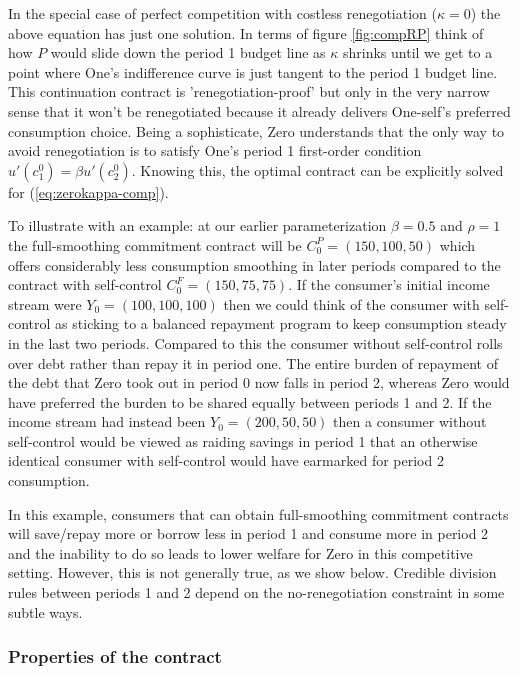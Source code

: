 \documentclass[11pt,english]{article}
\theoremstyle{plain}
\theoremstyle{definition}
\begin{document}
In the special case of perfect competition with costless renegotiation
($\kappa=0$) the above equation has just one solution. In terms of
figure \ref{fig:compRP} think of how $P$ would slide down the period
1 budget line as $\kappa$ shrinks until we get to a point where One's
indifference curve is just tangent to the period 1 budget line. This
continuation contract is 'renegotiation-proof' but only in the very
narrow sense that it won't be renegotiated because it already delivers
One-self's preferred consumption choice. Being a sophisticate, Zero
understands that the only way to avoid renegotiation is to satisfy
One's period 1 first-order condition $u'(c_{1}^{0})=\beta u'(c_{2}^{0})$.
Knowing this, the optimal contract can be explicitly solved for (\ref{eq:zerokappa-comp}).

To illustrate with an example: at our earlier parameterization
$\beta=0.5$ and $\rho=1$ the full-smoothing commitment contract
will be $C_{0}^{P}=(150,100,50)$ which offers considerably less consumption
smoothing in later periods compared to the contract with self-control
$C_{0}^{F}=(150,75,75)$. If the consumer's initial income stream
were $Y_{0}=(100,100,100)$ then we could think of the consumer with
self-control as sticking to a balanced repayment program to keep consumption
steady in the last two periods. Compared to this the consumer without
self-control rolls over debt rather than repay it in period one. The
entire burden of repayment of the debt that Zero took out in period
0 now falls in period 2, whereas Zero would have preferred the burden
to be shared equally between periods 1 and 2. If the income stream
had instead been $Y_{0}=(200,50,50)$ then a consumer without self-control
would be viewed as raiding savings in period 1 that an otherwise identical
consumer with self-control would have earmarked for period 2 consumption.

In this example, consumers that can obtain full-smoothing
commitment contracts will save/repay more or borrow less in period
1 and consume more in period 2 and the inability to do so leads to
lower welfare for Zero in this competitive setting. However, this
is not generally true, as we show below. Credible division rules between
periods 1 and 2 depend on the no-renegotiation constraint in some
subtle ways.

\subsubsection{Properties of the contract}
\end{document}
